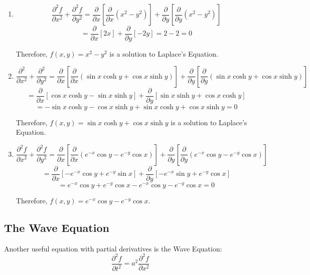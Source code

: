 \begin{Answer}[ref = laplace]
\begin{enumerate}
    \item $$\frac{\partial^2 f}{\partial x^2} + \frac{\partial^2 f}{\partial 
    y^2} = \frac{\partial}{\partial x} \left[ \frac{\partial}{\partial x} 
    \left( x^2 - y^2 \right) \right] + \frac{\partial}{\partial y} \left[ 
    \frac{\partial}{\partial y} \left( x^2 - y^2 \right) \right]$$
    $$= \frac{\partial}{\partial x} \left[ 2x \right] + \frac{\partial}{
    \partial y} \left[ -2y \right] = 2 - 2 = 0$$

    Therefore, $f(x, y) = x^2 - y^2$ is a solution to Laplace's Equation. 

    \item $$\frac{\partial^2}{\partial x^2} + \frac{\partial^2}{\partial y^2} 
    = \frac{\partial}{\partial x} \left[ \frac{\partial}{\partial x} \left( 
    \sin{x} \cosh{y} + \cos{x} \sinh{y} \right) \right] + \frac{\partial}{
    \partial y} \left[ \frac{\partial}{\partial y} \left( \sin{x} \cosh{y} + 
    \cos{x} \sinh{y} \right) \right]$$
    $$= \frac{\partial}{\partial x} \left[ \cos{x} \cosh{y} - \sin{x} \sinh{y} 
    \right] + \frac{\partial}{\partial y} \left[ \sin{x} \sinh{y} + \cos{x} 
    \cosh{y} \right]$$
    $$= -\sin{x}\cosh{y} - \cos{x}\sinh{y} + \sin{x}\cosh{y} + \cos{x} \sinh{
    y} = 0$$

    Therefore, $f(x, y) = \sin{x}\cosh{y} + \cos{x}\sinh{y}$ is a solution to 
    Laplace's Equation.

    \item $$\frac{\partial^2 f}{\partial x^2} + \frac{\partial^2 f}{\partial 
    y^2} = \frac{\partial}{\partial x} \left[ \frac{\partial}{\partial x} 
    \left( e^{-x}\cos{y} - e^{-y}\cos{x} \right) \right] + \frac{\partial}{
    \partial y} \left[ \frac{\partial}{\partial y} \left( e^{-x} \cos{y} - 
    e^{-y} \cos{x} \right) \right]$$
    $$= \frac{\partial}{\partial x} \left[ -e^{-x}\cos{y} + e^{-y}\sin{x} 
    \right] + \frac{\partial}{\partial y} \left[ -e^{-x}\sin{y} + e^{-y} 
    \cos{x} \right]$$
    $$= e^{-x} \cos{y} + e^{-y} \cos{x} - e^{-x} \cos{y} - e^{-y} \cos{x} = 0$$

    Therefore, $f(x, y) = e^{-x}\cos{y} - e^{-y}\cos{x}$.
\end{enumerate}
\end{Answer}

\subsection{The Wave Equation}
Another useful equation with partial derivatives is the Wave Equation:
$$\frac{\partial^2 f}{\partial t^2} = a^2 \frac{\partial^2 f}{\partial x^2}$$

